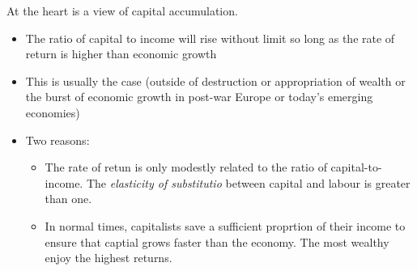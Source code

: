 \documentclass[12pt, a4paper, oneside]{article}\usepackage[]{graphicx}\usepackage[]{color}
\begin{document}
At the heart is a view of capital accumulation. 
\begin{itemize}
\item The ratio of capital to income will rise without limit so long as the rate of return is higher than economic growth
\item This is usually the case (outside of destruction or appropriation of wealth or the burst of economic growth in post-war Europe or today's emerging economies)
\item Two reasons: 
\begin{itemize}
\item The rate of retun is only modestly related to the ratio of capital-to-income.  The \emph{elasticity of substitutio} between capital and labour is greater than one.  
\item In normal times, capitalists save a sufficient proprtion of their income to ensure that captial grows faster than the economy.  The most wealthy enjoy the highest returns.
\end{itemize}
\end{itemize}
\end{document}
